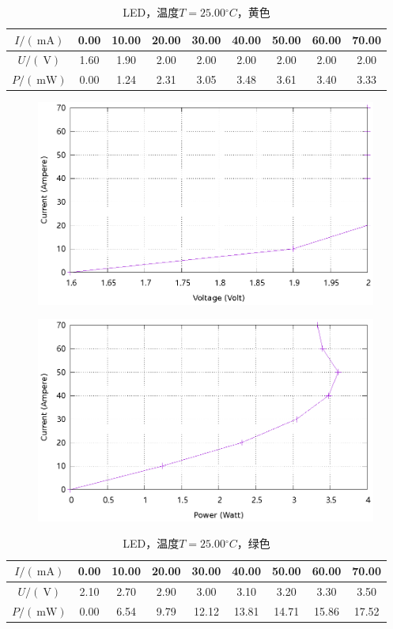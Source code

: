 \documentclass{ctexart}
\newcommand{\si}[1]{\  \mathrm{#1}}
\begin{document}
\newpage
\begin{table}[H]
    \centering
    \begin{tabular}{|c|c|c|c|c|c|c|c|c|}
        \hline
        $I/(\si{mA})$ & 0.00 & 10.00 & 20.00 & 30.00 & 40.00 & 50.00 & 60.00 & 70.00 \\\hline
        $U / (\si{V})$  & 1.60 & 1.90 & 2.00 & 2.00 & 2.00 & 2.00 & 2.00 & 2.00 \\\hline
        $P / (\si{mW})$ & 0.00 & 1.24 & 2.31 & 3.05 & 3.48 & 3.61 & 3.40 & 3.33 \\\hline
    \end{tabular}
    \caption{LED，温度$T=25.00{}^{\circ}C$，黄色}
\end{table}
\begin{figure}[H]
    \centering
    \includegraphics[width=0.9\linewidth]{../output/led-vc-3.gnuplot}
\end{figure}
\begin{figure}[H]
    \centering
    \includegraphics[width=0.9\linewidth]{../output/led-pc-3.gnuplot}
\end{figure}
\newpage
\begin{table}[H]
    \centering
    \begin{tabular}{|c|c|c|c|c|c|c|c|c|}
        \hline
        $I/(\si{mA})$ & 0.00 & 10.00 & 20.00 & 30.00 & 40.00 & 50.00 & 60.00 & 70.00 \\\hline
        $U / (\si{V})$  & 2.10 & 2.70 & 2.90 & 3.00 & 3.10 & 3.20 & 3.30 & 3.50 \\\hline
        $P / (\si{mW})$ & 0.00 & 6.54 & 9.79 & 12.12 & 13.81 & 14.71 & 15.86 & 17.52 \\\hline
    \end{tabular}
    \caption{LED，温度$T=25.00{}^{\circ}C$，绿色}
\end{table}
\end{document}
